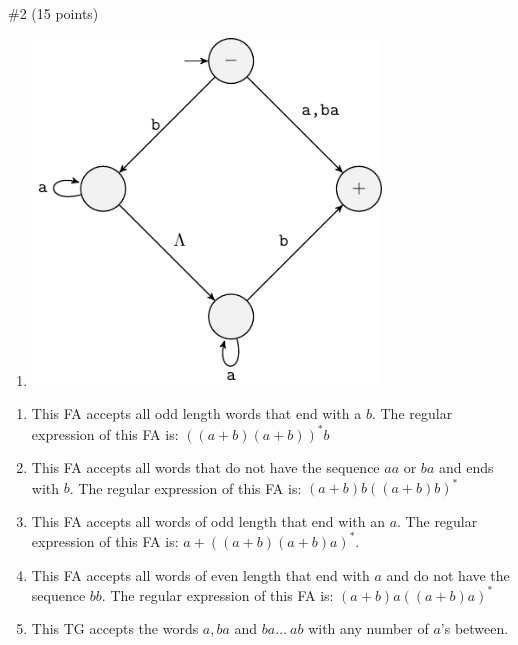 \begin{problem}{\#2 (15 points)}
\begin{enumerate}[label=\textbf{\alph*)}]
        \item \includegraphics[width=25em]{figures/question/Question2-E.pdf}
    \end{enumerate}
\end{problem}
\vspace{2em}
\begin{solution}
    \begin{enumerate}[label=\textbf{\alph*)}]
        \item This FA accepts all odd length words that end with a \(b\).
        The regular expression of this FA is: \(((a+b)(a+b))^*b\)
        \item This FA accepts all words that do not have the sequence \(aa\) or \(ba\) and ends with \(b\).
        The regular expression of this FA is: \((a+b)b((a+b)b)^*\)
        \item This FA accepts all words of odd length that end with an \(a\).
        The regular expression of this FA is: \(a+((a+b)(a+b)a)^*\).
        \item This FA accepts all words of even length that end with \(a\) and do not have the sequence \(bb\).
        The regular expression of this FA is: \((a+b)a((a+b)a)^*\)
        \item This TG accepts the words \(a,ba\) and \(ba \ldots\ ab\) with any number of \(a\)'s between.
    \end{enumerate}
\end{solution}

